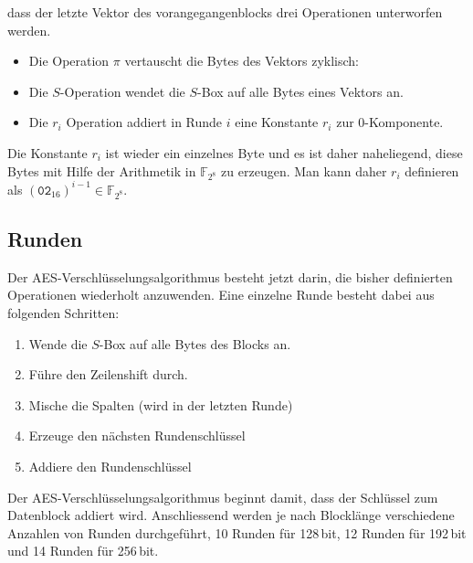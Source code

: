 dass der letzte Vektor des vorangegangenblocks drei Operationen
unterworfen werden.
\begin{itemize}
\item
Die Operation $\pi$ vertauscht die Bytes des Vektors zyklisch:
\begin{center}
\end{center}
\item
Die $S$-Operation wendet die $S$-Box auf alle Bytes eines Vektors an.
\item
Die $r_i$ Operation addiert in Runde $i$ eine Konstante $r_i$ zur $0$-Komponente.
\end{itemize}
Die Konstante $r_i$ ist wieder ein einzelnes Byte und es ist daher
naheliegend, diese Bytes mit Hilfe der Arithmetik in $\mathbb{F}_{2^8}$
zu erzeugen.
Man kann daher $r_i$ definieren als
$(\texttt{02}_{16})^{i-1}\in\mathbb{F}_{2^8}$.

\subsection{Runden}
Der AES-Verschlüsselungsalgorithmus besteht jetzt darin, die bisher
definierten Operationen wiederholt anzuwenden.
Eine einzelne Runde besteht dabei aus folgenden Schritten:
\begin{enumerate}
\item Wende die $S$-Box auf alle Bytes des Blocks an.
\item Führe den Zeilenshift durch.
\item Mische die Spalten (wird in der letzten Runde)
\item Erzeuge den nächsten Rundenschlüssel
\item Addiere den Rundenschlüssel
\end{enumerate}
Der AES-Verschlüsselungsalgorithmus beginnt damit, dass der Schlüssel
zum Datenblock addiert wird.
Anschliessend werden je nach Blocklänge verschiedene Anzahlen von
Runden durchgeführt, 10 Runden für 128\,bit, 12 Runden für 192\,bit und
14 Runden für 256\,bit.





